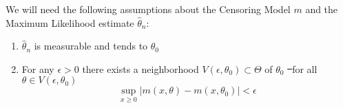 %
\vspace{1cm}
We will need the following assumptions about the Censoring Model $m$ and the Maximum Likelihood estimate $\hat\theta_n$:
\begin{enumerate}[({M}1)]
	\item \label{ass:m_consistency} $\hat{\theta}_n$ is measurable and tends to $\theta_0$
	\item \label{ass:m_nbhd} For any $\epsilon>0$ there exists a neighborhood $V(\epsilon, \theta_0)\subset \Theta$ of $\theta_0$ \st\ for all $\theta\in V(\epsilon, \theta_0)$ 
	$$\sup\limits_{x\geq 0} |m(x, \theta) - m(x, \theta_0)| < \epsilon$$
\end{enumerate}
